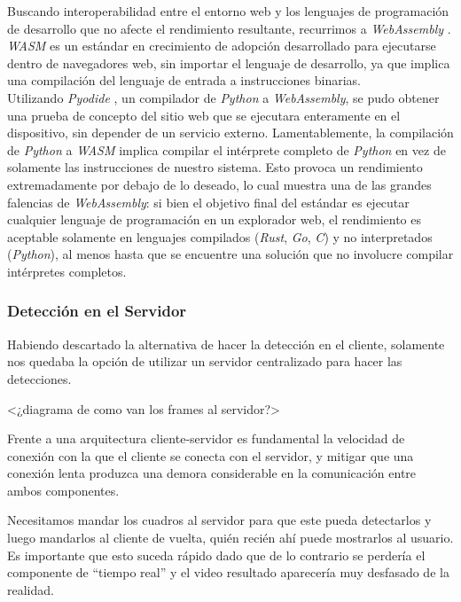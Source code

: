 \documentclass[a4paper]{article}
\begin{document}
Buscando interoperabilidad entre el entorno web y los lenguajes de programación de desarrollo que no afecte el rendimiento resultante, recurrimos a \textit{WebAssembly} \cite{wasm}. \textit{WASM} es un estándar en crecimiento de adopción desarrollado para ejecutarse dentro de navegadores web, sin importar el lenguaje de desarrollo, ya que implica una compilación del lenguaje de entrada a instrucciones binarias.\\

Utilizando \textit{Pyodide} \cite{pyodide}, un compilador de \textit{Python} a \textit{WebAssembly}, se pudo obtener una prueba de concepto del sitio web que se ejecutara enteramente en el dispositivo, sin depender de un servicio externo. Lamentablemente, la compilación de \textit{Python} a \textit{WASM} implica compilar el intérprete completo de \textit{Python} en vez de solamente las instrucciones de nuestro sistema. Esto provoca un rendimiento extremadamente por debajo de lo deseado, lo cual muestra una de las grandes falencias de \textit{WebAssembly}: si bien el objetivo final del estándar es ejecutar cualquier lenguaje de programación en un explorador web, el rendimiento es aceptable solamente en lenguajes compilados (\textit{Rust}, \textit{Go}, \textit{C}) y no interpretados (\textit{Python}), al menos hasta que se encuentre una solución que no involucre compilar intérpretes completos.

\subsubsection{Detección en el Servidor}

Habiendo descartado la alternativa de hacer la detección en el cliente, solamente nos quedaba la opción de utilizar un servidor centralizado para hacer las detecciones.

<¿diagrama de como van los frames al servidor?>

Frente a una arquitectura cliente-servidor es fundamental la velocidad de conexión con la que el cliente se conecta con el servidor, y mitigar que una conexión lenta produzca una demora considerable en la comunicación entre ambos componentes.

Necesitamos mandar los cuadros al servidor para que este pueda detectarlos y luego mandarlos al cliente de vuelta, quién recién ahí puede mostrarlos al usuario. Es importante que esto suceda rápido dado que de lo contrario se perdería el componente de ``tiempo real'' y el video resultado aparecería muy desfasado de la realidad.
\end{document}
